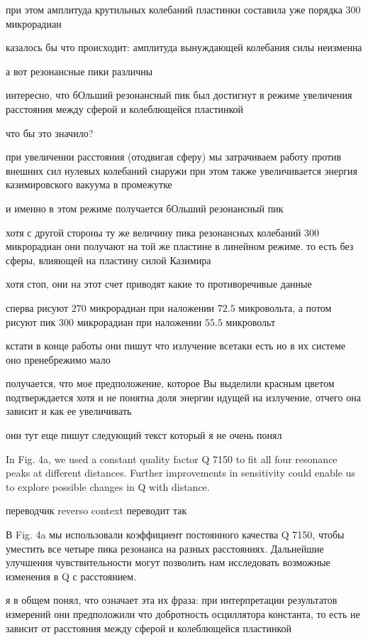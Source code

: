 \documentclass[12pt, letterpaper]{article}
\begin{document}
при этом амплитуда крутильных колебаний пластинки составила уже порядка 300 микрорадиан

казалось бы что происходит: амплитуда вынуждающей колебания силы неизменна

а вот резонансные пики различны

интересно, что бОльший резонансный пик был достигнут в режиме увеличения расстояния между сферой и колеблющейся пластинкой

что бы это значило?

при увеличении расстояния (отодвигая сферу) мы затрачиваем работу против внешних сил нулевых колебаний снаружи
при этом также увеличивается энергия казимировского вакуума в промежутке

и именно в этом режиме получается бОльший резонансный пик

хотя с другой стороны ту же величину пика резонансных колебаний $300$ микрорадиан они получают на той же пластине в линейном режиме. то есть без сферы, влияющей на пластину силой Казимира

хотя стоп, они на этот счет приводят какие то противоречивые данные

сперва рисуют $270$ микрорадиан при наложении $72.5$ микровольта, а потом рисуют пик $300$ микрорадиан при наложении $55.5$ микровольт

кстати в конце работы они пишут что излучение всетаки есть но в их системе оно пренебрежимо мало

получается, что мое предположение, которое Вы выделили красным цветом подтверждается хотя и не понятна доля энергии идущей на излучение, отчего она зависит и как ее увеличивать

они тут еще пишут следующий текст который я не очень понял


In Fig. 4a, we used a constant quality factor Q 7150 to fit all four resonance peaks at different distances. Further improvements in sensitivity could enable us to explore possible changes in Q with distance.

переводчик reverso context переводит так

В Fig. 4a мы использовали коэффициент постоянного качества Q 7150, чтобы уместить все четыре пика резонанса на разных расстояниях. Дальнейшие улучшения чувствительности могут позволить нам исследовать возможные изменения в Q с расстоянием.


я в общем понял, что означает эта их фраза: при интерпретации результатов измерений они предположили что добротность осциллятора константа, то есть не зависит от расстояния между сферой и колеблющейся пластинкой
\end{document}

